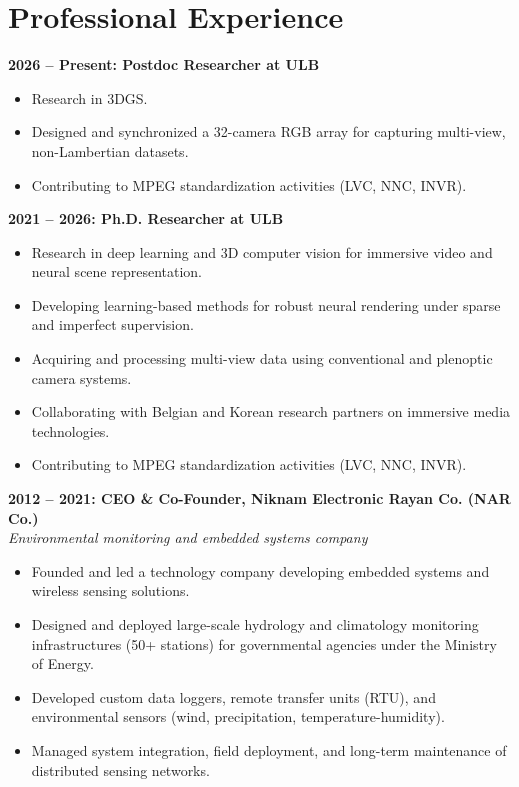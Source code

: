 \documentclass[11pt,a4paper]{article}
\newcommand{\blueitem}[1]{\textcolor{subtitleblue}{\textbf{#1}}}
\begin{document}
\section*{Professional Experience}

\blueitem{2026 -- Present: Postdoc Researcher at ULB}
\begin{itemize}
    \item Research in 3DGS.
    \item Designed and synchronized a 32-camera RGB array for capturing multi-view, non-Lambertian datasets.
    \item Contributing to MPEG standardization activities (LVC, NNC, INVR).
\end{itemize}

\blueitem{2021 -- 2026: Ph.D. Researcher at ULB}
\begin{itemize}
    \item Research in deep learning and 3D computer vision for immersive video and neural scene representation.
    \item Developing learning-based methods for robust neural rendering under sparse and imperfect supervision.
    \item Acquiring and processing multi-view data using conventional and plenoptic camera systems.
    \item Collaborating with Belgian and Korean research partners on immersive media technologies.
    \item Contributing to MPEG standardization activities (LVC, NNC, INVR).
\end{itemize}

\vspace{0.3em}

\blueitem{2012 -- 2021: CEO \& Co-Founder, Niknam Electronic Rayan Co. (NAR Co.)} \\
\textit{Environmental monitoring and embedded systems company}
\begin{itemize}
    \item Founded and led a technology company developing embedded systems and wireless sensing solutions.
    \item Designed and deployed large-scale hydrology and climatology monitoring infrastructures (50+ stations) for governmental agencies under the Ministry of Energy.
    \item Developed custom data loggers, remote transfer units (RTU), and environmental sensors (wind, precipitation, temperature-humidity).
    \item Managed system integration, field deployment, and long-term maintenance of distributed sensing networks.
\end{itemize}
\end{document}
